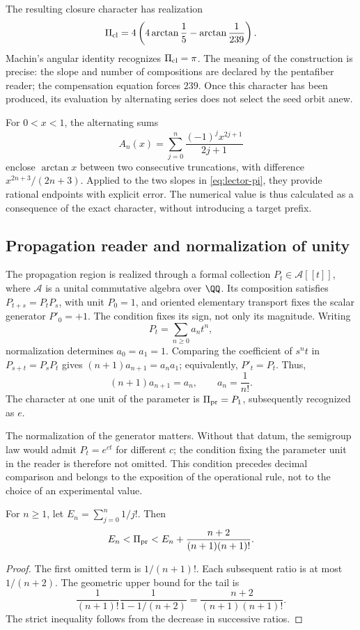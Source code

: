 The resulting closure character has realization
\begin{equation}
 \Pi_{\rm cl}=4\left(4\arctan\frac15-\arctan\frac1{239}\right).
 \label{eq:lector-pi}
\end{equation}
Machin's angular identity recognizes \(\Pi_{\rm cl}=\pi\). The meaning of the construction is precise: the slope and number of compositions are declared by the pentafiber reader; the compensation equation forces \(239\). Once this character has been produced, its evaluation by alternating series does not select the seed orbit anew.

For \(0<x<1\), the alternating sums
\[
 A_n(x)=\sum_{j=0}^n\frac{(-1)^jx^{2j+1}}{2j+1}
\]
enclose \(\arctan x\) between two consecutive truncations, with difference \(x^{2n+3}/(2n+3)\). Applied to the two slopes in \eqref{eq:lector-pi}, they provide rational endpoints with explicit error. The numerical value is thus calculated as a consequence of the exact character, without introducing a target prefix.

\subsection{Propagation reader and normalization of unity}

The propagation region is realized through a formal collection \(P_t\in\mathcal A[[t]]\), where \(\mathcal A\) is a unital commutative algebra over \(\QQ\). Its composition satisfies \(P_{t+s}=P_tP_s\), with unit \(P_0=1\), and oriented elementary transport fixes the scalar generator \(P'_0=+1\). The condition fixes its sign, not only its magnitude. Writing
\[
 P_t=\sum_{n\ge0}a_nt^n,
\]
normalization determines \(a_0=a_1=1\). Comparing the coefficient of \(s^nt\) in \(P_{s+t}=P_sP_t\) gives \((n+1)a_{n+1}=a_na_1\); equivalently, \(P'_t=P_t\). Thus,
\begin{equation}
 (n+1)a_{n+1}=a_n,\qquad a_n=\frac1{n!}.
 \label{eq:propagacion}
\end{equation}
The character at one unit of the parameter is \(\Pi_{\rm pr}=P_1\), subsequently recognized as \(e\).

The normalization of the generator matters. Without that datum, the semigroup law would admit \(P_t=e^{ct}\) for different \(c\); the condition fixing the parameter unit in the reader is therefore not omitted. This condition precedes decimal comparison and belongs to the exposition of the operational rule, not to the choice of an experimental value.

\begin{proposition}
For \(n\ge1\), let \(E_n=\sum_{j=0}^n1/j!\). Then
\[
 E_n<\Pi_{\rm pr}<E_n+\frac{n+2}{(n+1)(n+1)!}.
\]
\end{proposition}
\begin{proof}
The first omitted term is \(1/(n+1)!\). Each subsequent ratio is at most \(1/(n+2)\). The geometric upper bound for the tail is
\[
 \frac1{(n+1)!}\frac1{1-1/(n+2)}
 =\frac{n+2}{(n+1)(n+1)!}.
\]
The strict inequality follows from the decrease in successive ratios.
\end{proof}

